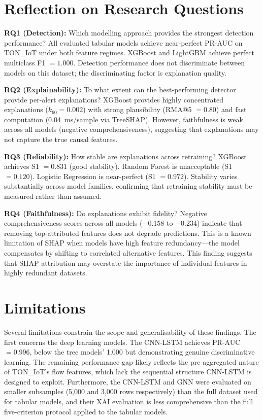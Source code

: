 \documentclass[12pt,a4paper]{report}
\begin{document}
\section{Reflection on Research Questions}
\label{sec:rq-reflection}

\textbf{RQ1 (Detection):} Which modelling approach provides the strongest detection performance? All evaluated tabular models achieve near-perfect PR-AUC on TON\_IoT under both feature regimes. XGBoost and LightGBM achieve perfect multiclass F1 $= 1.000$. Detection performance does not discriminate between models on this dataset; the discriminating factor is explanation quality.

\textbf{RQ2 (Explainability):} To what extent can the best-performing detector provide per-alert explanations? XGBoost provides highly concentrated explanations ($k_{90} = 0.002$) with strong plausibility (RMA@5 $= 0.80$) and fast computation (0.04~ms/sample via TreeSHAP). However, faithfulness is weak across all models (negative comprehensiveness), suggesting that explanations may not capture the true causal features.

\textbf{RQ3 (Reliability):} How stable are explanations across retraining? XGBoost achieves S1 $= 0.831$ (good stability). Random Forest is unacceptable (S1 $= 0.120$). Logistic Regression is near-perfect (S1 $= 0.972$). Stability varies substantially across model families, confirming that retraining stability must be measured rather than assumed.

\textbf{RQ4 (Faithfulness):} Do explanations exhibit fidelity? Negative comprehensiveness scores across all models ($-0.158$ to $-0.234$) indicate that removing top-attributed features does not degrade predictions. This is a known limitation of SHAP when models have high feature redundancy---the model compensates by shifting to correlated alternative features. This finding suggests that SHAP attribution may overstate the importance of individual features in highly redundant datasets.

\section{Limitations}
\label{sec:limitations}

Several limitations constrain the scope and generalisability of these findings. The first concerns the deep learning models. The CNN-LSTM achieves PR-AUC $= 0.996$, below the tree models' 1.000 but demonstrating genuine discriminative learning. The remaining performance gap likely reflects the pre-aggregated nature of TON\_IoT's flow features, which lack the sequential structure CNN-LSTM is designed to exploit. Furthermore, the CNN-LSTM and GNN were evaluated on smaller subsamples (5,000 and 3,000 rows respectively) than the full dataset used for tabular models, and their XAI evaluation is less comprehensive than the full five-criterion protocol applied to the tabular models.
\end{document}

